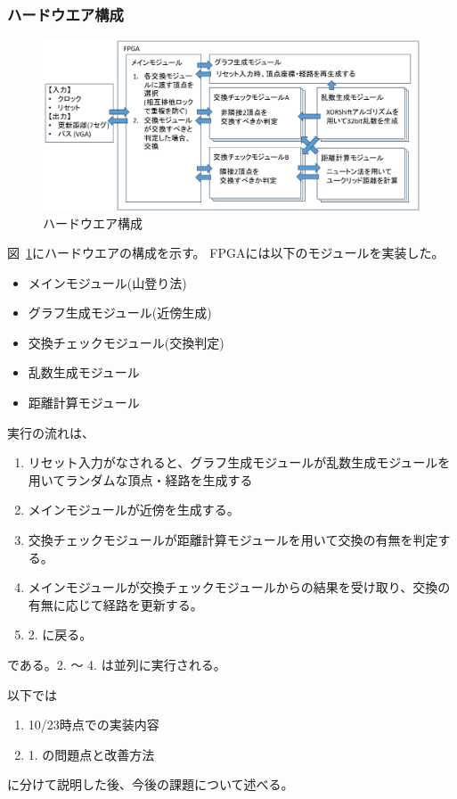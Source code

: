 \subsubsection*{ハードウエア構成}
\begin{figure}
    \label{fig:hardware}
    \begin{center}
        \includegraphics[width=15cm]{figure/hardware.png}
        \caption{ハードウエア構成}
    \end{center}
\end{figure}

図~\ref{fig:hardware}にハードウエアの構成を示す。
FPGAには以下のモジュールを実装した。
\begin{itemize}
    \item メインモジュール(山登り法)
    \item グラフ生成モジュール(近傍生成)
    \item 交換チェックモジュール(交換判定)
    \item 乱数生成モジュール
    \item 距離計算モジュール
\end{itemize}
実行の流れは、
\begin{enumerate}
    \item リセット入力がなされると、グラフ生成モジュールが乱数生成モジュールを用いてランダムな頂点・経路を生成する
    \item メインモジュールが近傍を生成する。
    \item 交換チェックモジュールが距離計算モジュールを用いて交換の有無を判定する。
    \item メインモジュールが交換チェックモジュールからの結果を受け取り、交換の有無に応じて経路を更新する。
    \item 2. に戻る。
\end{enumerate}
である。2. ～ 4. は並列に実行される。

以下では
\begin{enumerate}
    \item 10/23時点での実装内容
    \item 1. の問題点と改善方法
\end{enumerate}
に分けて説明した後、今後の課題について述べる。

